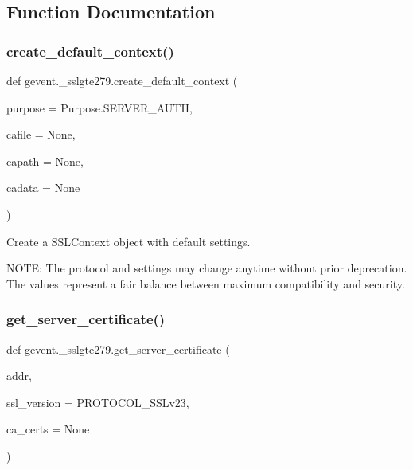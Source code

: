 \subsection{Function Documentation}
\mbox{\label{namespacegevent_1_1__sslgte279_a3b13b1f1795f96a3d30958d39dda5f4f}} 
\subsubsection{\texorpdfstring{create\+\_\+default\+\_\+context()}{create\_default\_context()}}
{\footnotesize\ttfamily def gevent.\+\_\+sslgte279.\+create\+\_\+default\+\_\+context (\begin{DoxyParamCaption}\item[{}]{purpose = {\ttfamily Purpose.SERVER\+\_\+AUTH},  }\item[{}]{cafile = {\ttfamily None},  }\item[{}]{capath = {\ttfamily None},  }\item[{}]{cadata = {\ttfamily None} }\end{DoxyParamCaption})}

\begin{DoxyVerb}Create a SSLContext object with default settings.

NOTE: The protocol and settings may change anytime without prior
      deprecation. The values represent a fair balance between maximum
      compatibility and security.
\end{DoxyVerb}
 \mbox{\label{namespacegevent_1_1__sslgte279_ac5f054164ee9c0ac0584e98c553bc656}} 
\subsubsection{\texorpdfstring{get\+\_\+server\+\_\+certificate()}{get\_server\_certificate()}}
{\footnotesize\ttfamily def gevent.\+\_\+sslgte279.\+get\+\_\+server\+\_\+certificate (\begin{DoxyParamCaption}\item[{}]{addr,  }\item[{}]{ssl\+\_\+version = {\ttfamily PROTOCOL\+\_\+SSLv23},  }\item[{}]{ca\+\_\+certs = {\ttfamily None} }\end{DoxyParamCaption})}

